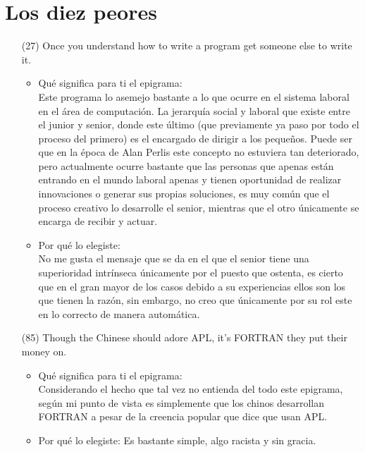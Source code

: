 \documentclass{article}
\begin{document}
\section{Los diez peores}
\begin{itemize}
    \item[(27)]Once you understand how to write a program get someone else to write it.
    \begin{itemize}
        \item Qué significa para ti el epigrama:\\
        Este programa lo asemejo bastante a lo que ocurre en el sistema laboral en el área de computación. La jerarquía social y laboral que existe entre el junior y senior, donde este último (que previamente ya paso por todo el proceso del primero) es el encargado de dirigir a los pequeños. Puede ser que en la época de Alan Perlis este concepto no estuviera tan deteriorado, pero actualmente ocurre bastante que las personas que apenas están entrando en el mundo laboral apenas y tienen oportunidad de realizar innovaciones o generar sus propias soluciones, es muy común que el proceso creativo lo desarrolle el senior, mientras que el otro únicamente se encarga de recibir y actuar.
        \item Por qué lo elegiste:\\
        No me gusta el mensaje que se da en el que el senior tiene una superioridad intrínseca únicamente por el puesto que ostenta, es cierto que en el gran mayor de los casos debido a su experiencias ellos son los que tienen la razón, sin embargo, no creo que únicamente por su rol este en lo correcto de manera automática.
    \end{itemize}
    \item[(85)]Though the Chinese should adore APL, it’s FORTRAN they put their money on.
    \begin{itemize}
        \item Qué significa para ti el epigrama:\\
        Considerando el hecho que tal vez no entienda del todo este epigrama, según mi punto de vista es simplemente que los chinos desarrollan FORTRAN a pesar de la creencia popular que dice que usan APL.
        \item Por qué lo elegiste:
        Es bastante simple, algo racista y sin gracia.

\end{itemize}
\end{itemize}
\end{document}
